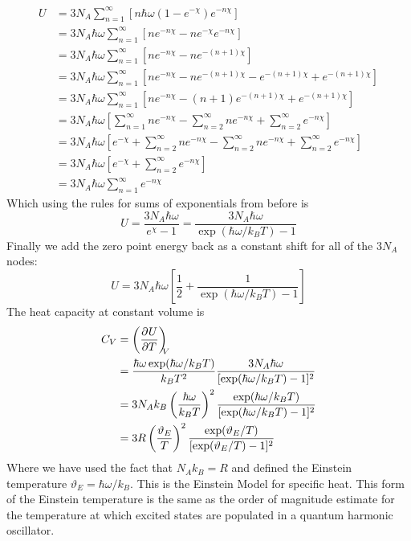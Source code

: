     \begin{align*}
        U &= 3N_A\sum_{n = 1}^\infty \left[n\hbar\omega(1 - e^{-\chi})e^{-n\chi}\right]\\
        &= 3N_A\hbar\omega\sum_{n = 1}^\infty\left[ne^{-n\chi} - ne^{-\chi}e^{-n\chi}\right]\\
        &= 3N_A\hbar\omega\sum_{n = 1}^\infty\left[ne^{-n\chi} - ne^{-(n + 1)\chi}\right]\\
        &= 3N_A\hbar\omega\sum_{n = 1}^\infty\left[ne^{-n\chi} - ne^{-(n + 1)\chi} - e^{-(n + 1)\chi} + e^{-(n + 1)\chi}\right]\\
        &= 3N_A\hbar\omega\sum_{n = 1}^\infty\left[ne^{-n\chi} - (n + 1)e^{-(n + 1)\chi} + e^{-(n + 1)\chi}\right]\\
        &= 3N_A\hbar\omega\left[\sum_{n = 1}^\infty ne^{-n\chi} - \sum_{n = 2}^\infty ne^{-n\chi} + \sum_{n = 2}^\infty e^{-n\chi}\right]\\
        &= 3N_A\hbar\omega\left[e^{-\chi} + \sum_{n = 2}^\infty ne^{-n\chi} - \sum_{n = 2}^\infty ne^{-n\chi} + \sum_{n = 2}^\infty e^{-n\chi}\right]\\
        &= 3N_A\hbar\omega\left[e^{-\chi} + \sum_{n = 2}^\infty e^{-n\chi}\right]\\
        &= 3N_A\hbar\omega\sum_{n = 1}^\infty e^{-n\chi}
    \end{align*}
    Which using the rules for sums of exponentials from before is
    \[U = \frac{3N_A\hbar\omega}{e^{\chi} - 1} = \frac{3N_A\hbar\omega}{\exp(\hbar\omega/k_BT) - 1}\]
    Finally we add the zero point energy back as a constant shift for all of the \(3N_A\) nodes:
    \[U = 3N_A\hbar\omega\left[\frac{1}{2} + \frac{1}{\exp(\hbar\omega/k_BT) - 1}\right]\]
    The heat capacity at constant volume is
    \begin{align*}
        C_V &= \left(\pdv[]{U}{T}\right)_{\!\!\!{V}}\\
        &= \frac{\hbar\omega\exp(\hbar\omega/k_BT)}{k_BT^2} \frac{3N_A\hbar\omega}{[\exp(\hbar\omega/k_BT) - 1]^2}\\
        &= 3N_Ak_B\left(\frac{\hbar\omega}{k_BT}\right)^2 \frac{\exp(\hbar\omega/k_BT)}{[\exp(\hbar\omega/k_BT) - 1]^2}\\
        &= 3R\left(\frac{\vartheta_E}{T}\right)^2\frac{\exp(\vartheta_E/T)}{[\exp(\vartheta_E/T) - 1]^2}
    \end{align*}
    Where we have used the fact that \(N_Ak_B = R\) and defined the Einstein temperature \(\vartheta_E = \hbar\omega/k_B\).
    This is the Einstein Model for specific heat.
    This form of the Einstein temperature is the same as the order of magnitude estimate for the temperature at which excited states are populated in a quantum harmonic oscillator.
    
